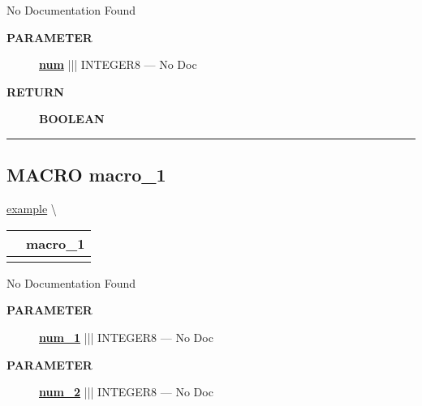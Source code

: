 \par





No Documentation Found






\par
\begin{description}
\item [\colorbox{tagtype}{\color{white} \textbf{\textsf{PARAMETER}}}] \textbf{\underline{num}} ||| INTEGER8 --- No Doc
\end{description}







\par
\begin{description}
\item [\colorbox{tagtype}{\color{white} \textbf{\textsf{RETURN}}}] \textbf{BOOLEAN} 
\end{description}




\rule{\linewidth}{0.5pt}
\subsection*{\textsf{\colorbox{headtoc}{\color{white} MACRO}
macro\_1}}

\hypertarget{ecldoc:example.macro_1}{}
\hspace{0pt} \hyperlink{ecldoc:example}{example} \textbackslash 

{\renewcommand{\arraystretch}{1.5}
\begin{tabularx}{\textwidth}{|>{\raggedright\arraybackslash}l|X|}
\hline
\hspace{0pt}\mytexttt{\color{red} } & \textbf{macro\_1} \\
\hline
\multicolumn{2}{|>{\raggedright\arraybackslash}X|}{\hspace{0pt}\mytexttt{\color{param} (num\_1, num\_2)}} \\
\hline
\end{tabularx}
}

\par





No Documentation Found






\par
\begin{description}
\item [\colorbox{tagtype}{\color{white} \textbf{\textsf{PARAMETER}}}] \textbf{\underline{num\_1}} ||| INTEGER8 --- No Doc
\item [\colorbox{tagtype}{\color{white} \textbf{\textsf{PARAMETER}}}] \textbf{\underline{num\_2}} ||| INTEGER8 --- No Doc
\end{description}







